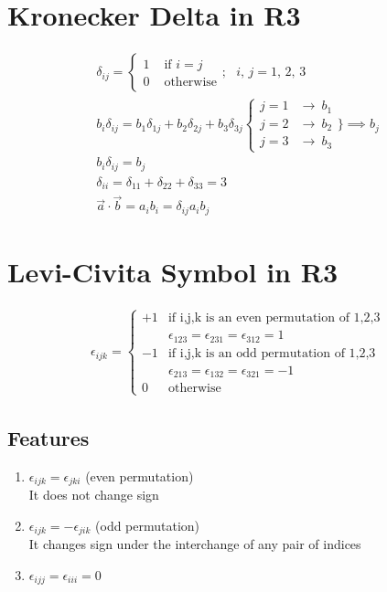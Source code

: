 \documentclass[a4paper, 11pt, normalem]{report}
\begin{document}
\section{Kronecker Delta in R3}
\begin{gather*}
    \delta_{ij} =
    \begin{cases}
        1 & \text{ if } i = j \\
        0 & \text{ otherwise}
    \end{cases}
    ;~~~ i,\,j = 1,\,2,\,3 \\
    b_{i}\delta_{ij} = b_{1}\delta_{1j} + b_{2}\delta_{2j} + b_{3}\delta_{3j}
    \begin{cases}
        j = 1 & \to ~ b_{1} \\
        j = 2 & \to ~ b_{2} \\
        j = 3 & \to ~ b_{3}
    \end{cases}
    \Bigg\} \implies b_{j} \\
    b_{i}\delta_{ij} = b_{j} \\
    \delta_{ii} = \delta_{11} + \delta_{22} + \delta_{33} = 3 \\
    \vec{a} \cdot \vec{b} = a_{i}b_{i} = \delta_{ij}a_{i}b_{j}
\end{gather*}

\section{Levi-Civita Symbol in R3}
\begin{gather*}
    \epsilon_{ijk} =
    \begin{cases}
        +1 & \text{if i,j,k is an even permutation of 1,2,3}       \\
           & \epsilon_{123} = \epsilon_{231} = \epsilon_{312} = 1  \\
        -1 & \text{if i,j,k is an odd permutation of 1,2,3}        \\
           & \epsilon_{213} = \epsilon_{132} = \epsilon_{321} = -1 \\
        0  & \text{otherwise}
    \end{cases}
\end{gather*}
\subsection{Features}
\begin{enumerate}
    \item $\epsilon_{ijk} = \epsilon_{jki}$ (even permutation) \\
          It does not change sign
    \item $\epsilon_{ijk} = -\epsilon_{jik}$ (odd permutation) \\
          It changes sign under the interchange of any pair of indices
    \item $\epsilon_{ijj} = \epsilon_{iii} = 0$
\end{enumerate}
\end{document}
